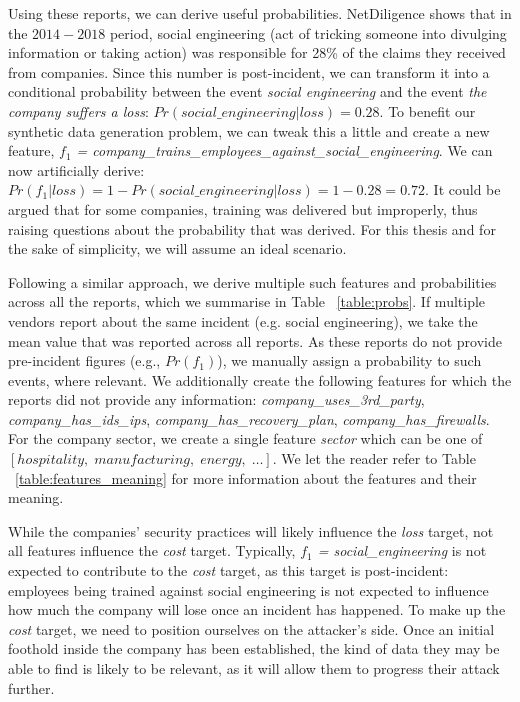 Using these reports, we can derive useful probabilities. NetDiligence \cite{netdiligence_report} shows that in the $2014-2018$ period, social engineering (act of tricking someone into divulging information or taking action) was responsible for 28\% of the claims they received from companies. Since this number is post-incident, we can transform it into a conditional probability between the event \textit{social engineering} and the event \textit{the company suffers a loss}: $Pr(social\_engineering | loss) = 0.28$. To benefit our synthetic data generation problem, we can tweak this a little and create a new feature, \textit{$f_1$ = company\_trains\_employees\_against\_social\_engineering}. We can now artificially derive: $Pr(f_1 | loss) = 1 - Pr(social\_engineering | loss) = 1 - 0.28 = 0.72$. It could be argued that for some companies, training was delivered but improperly, thus raising questions about the probability that was derived. For this thesis and for the sake of simplicity, we will assume an ideal scenario.

Following a similar approach, we derive multiple such features and probabilities across all the reports, which we summarise in Table ~\ref{table:probs}. If multiple vendors report about the same incident (e.g. social engineering), we take the mean value that was reported across all reports. As these reports do not provide pre-incident figures (e.g., $Pr(f_1)$), we manually assign a probability to such events, where relevant. We additionally create the following features for which the reports did not provide any information: \textit{company\_uses\_3rd\_party}, \textit{company\_has\_ids\_ips}, \textit{company\_has\_recovery\_plan}, \textit{company\_has\_firewalls}. For the company sector, we create a single feature \textit{sector} which can be one of $[hospitality, \; manufacturing, \; energy, \; \dots]$. We let the reader refer to Table ~\ref{table:features_meaning} for more information about the features and their meaning.

While the companies' security practices will likely influence the \textit{loss} target, not all features influence the \textit{cost} target. Typically, \textit{$f_1$ = social\_engineering} is not expected to contribute to the \textit{cost} target, as this target is post-incident: employees being trained against social engineering is not expected to influence how much the company will lose once an incident has happened. To make up the \textit{cost} target, we need to position ourselves on the attacker's side. Once an initial foothold inside the company has been established, the kind of data they may be able to find is likely to be relevant, as it will allow them to progress their attack further.

